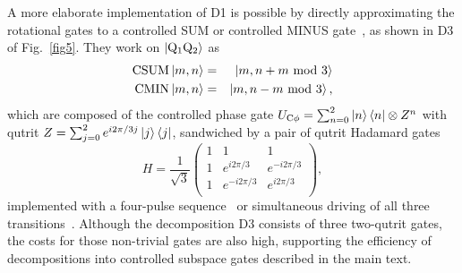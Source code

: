 A more elaborate implementation of D1 is possible by directly approximating the rotational gates to a controlled SUM or controlled MINUS gate~\cite{blok2021}, as shown in D3 of Fig.~\ref{fig5}.
They work on $\ket{{\rm Q_1Q_2}}$ as
\begin{eqnarray}
{\rm CSUM}\ket{m, n} &=& \ket{m, n+m \ {\rm mod} \ 3} \\
{\rm CMIN}\ket{m, n} &=& \ket{m, n-m \ {\rm mod} \ 3},
\end{eqnarray}
which are composed of the controlled phase gate $U_{{\rm C}\phi} = \sum_{n=0}^{2} \ket{n} \bra{n} \otimes Z^{n}$ with qutrit $Z = \sum_{j=0}^{2} e^{i 2\pi/3 j} \ket{j}\bra{j}$,
sandwiched by a pair of qutrit Hadamard gates
\begin{equation}
H = \frac{1}{\sqrt{3}}
\begin{pmatrix}
1&1&1\\
1&e^{i 2\pi/3}&e^{-i 2\pi/3}\\
1&e^{-i 2\pi/3}&e^{i 2\pi/3}\\
\end{pmatrix},
\end{equation}
implemented with a four-pulse sequence~\cite{morvan2021} or simultaneous driving of all three transitions~\cite{yurtalan2020}.
Although the decomposition D3 consists of three two-qutrit gates, the costs for those non-trivial gates are also high, supporting the efficiency of decompositions into controlled subspace gates described in the main text.

%

%
